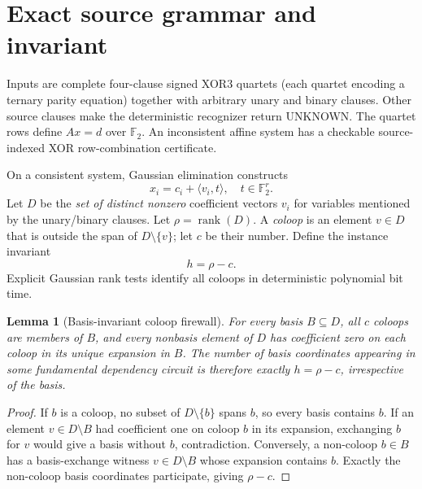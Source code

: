 \documentclass[11pt]{article}
\newtheorem{lemma}[theorem]{Lemma}
\begin{document}
\section{Exact source grammar and invariant}
Inputs are complete four-clause signed XOR3 quartets (each quartet encoding a ternary parity equation) together with arbitrary unary and binary clauses. Other source clauses make the deterministic recognizer return UNKNOWN. The quartet rows define $Ax=d$ over $\mathbb F_2$. An inconsistent affine system has a checkable source-indexed XOR row-combination certificate.

On a consistent system, Gaussian elimination constructs
\[
x_i=c_i+\langle v_i,t\rangle,\quad t\in\mathbb F_2^r.
\]
Let $D$ be the \emph{set of distinct nonzero} coefficient vectors $v_i$ for variables mentioned by the unary/binary clauses. Let $\rho=\operatorname{rank}(D)$. A \emph{coloop} is an element $v\in D$ that is outside the span of $D\setminus\{v\}$; let $c$ be their number. Define the instance invariant
\[
\boxed{h=\rho-c.}
\]
Explicit Gaussian rank tests identify all coloops in deterministic polynomial bit time.

\begin{lemma}[Basis-invariant coloop firewall]
For every basis $B\subseteq D$, all $c$ coloops are members of $B$, and every nonbasis element of $D$ has coefficient zero on each coloop in its unique expansion in $B$. The number of basis coordinates appearing in some fundamental dependency circuit is therefore exactly $h=\rho-c$, irrespective of the basis.
\end{lemma}
\begin{proof}
If $b$ is a coloop, no subset of $D\setminus\{b\}$ spans $b$, so every basis contains $b$. If an element $v\in D\setminus B$ had coefficient one on coloop $b$ in its expansion, exchanging $b$ for $v$ would give a basis without $b$, contradiction. Conversely, a non-coloop $b\in B$ has a basis-exchange witness $v\in D\setminus B$ whose expansion contains $b$. Exactly the non-coloop basis coordinates participate, giving $\rho-c$.
\end{proof}
\end{document}
